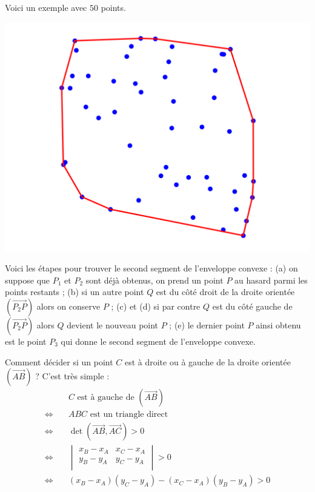 \documentclass[11pt,class=report,crop=false]{standalone}
\begin{document}
Voici un exemple avec $50$ points.
\begin{center}
	\includegraphics[scale=\myscale,scale=0.6]{figures/enveloppe}
\end{center}

\bigskip
	
Voici les étapes pour trouver le second segment de l'enveloppe convexe :
(a) on suppose que $P_1$ et $P_2$ sont déjà obtenus, on prend un point $P$ au hasard parmi les points restants ; 
(b) si un autre point $Q$ est du côté droit de la droite orientée $(\vec{P_2P})$ alors on conserve $P$ ;
(c) et (d) si par contre $Q$ est du côté gauche de $(\vec{P_2P})$ alors $Q$ devient le nouveau point $P$ ;
(e) le dernier point $P$ ainsi obtenu est le point $P_3$ qui donne le second segment de l'enveloppe convexe.



Comment décider si un point $C$ est à droite ou à gauche de la droite orientée $(\vec{AB})$ ?
C'est très simple :
\begin{align*}
	 & C \text{ est à gauche de } (\vec{AB}) \\
\iff\quad & ABC \text{ est un triangle direct } \\
\iff\quad & \det( \vec{AB}, \vec{AC} ) > 0 \\
\iff\quad & \begin{vmatrix} x_B -x_A & x_C-x_A \\ y_B -y_A & y_C-y_A \\	\end{vmatrix} > 0 \\
\iff\quad & (x_B -x_A)(y_C-y_A) - (x_C-x_A)(y_B -y_A) > 0
\end{align*}
\end{document}
